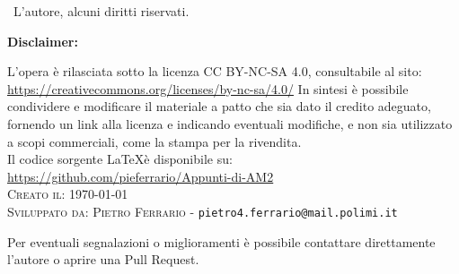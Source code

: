 \textcopyright \ L'autore, alcuni diritti riservati.\\
\vspace*{6pt}

\textbf{Disclaimer:} 
\vspace*{12pt}

L'opera è rilasciata sotto la licenza CC BY-NC-SA 4.0, consultabile al sito:\\
\url{https://creativecommons.org/licenses/by-nc-sa/4.0/}
\newline
In sintesi è possibile condividere e modificare il materiale a patto che sia dato il credito adeguato,  fornendo un link alla licenza e indicando eventuali modifiche, e non sia utilizzato a scopi commerciali, come la stampa per la rivendita.\\
Il codice sorgente \LaTeX è disponibile su:\\
\url{https://github.com/pieferrario/Appunti-di-AM2}\\

\noindent\textsc{Creato il:} \today\\
\noindent\textsc{Sviluppato da:}
\textsc{Pietro Ferrario} - \texttt{pietro4.ferrario@mail.polimi.it}

Per eventuali segnalazioni o miglioramenti è possibile contattare direttamente l'autore o aprire una Pull Request.
